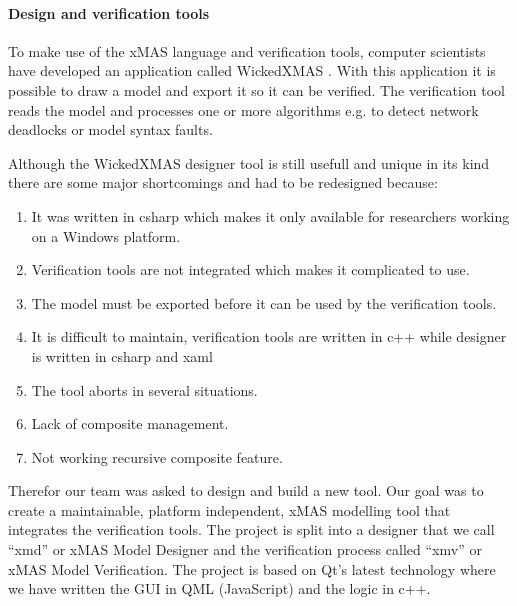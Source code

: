 \paragraph{Design and verification tools}

To make use of the xMAS language and verification tools, computer scientists
have developed an application called WickedXMAS \cite{WickedXmas}.
With this application it is possible to draw a model and export it so it can be
verified. The verification tool reads the model and processes one or more
algorithms e.g. to detect network deadlocks or model syntax faults.

Although the WickedXMAS designer tool is still usefull and unique in its kind
there are some major shortcomings and had to be redesigned because:
\begin{enumerate}
\item It was written in csharp which makes it only available for researchers
working on a Windows platform.
\item Verification tools are not integrated which
makes it complicated to use.
\item The model must be exported before it can be
used by the verification tools.
\item It is difficult to maintain, verification tools are written in c++ while
designer is written in csharp and xaml
\item The tool aborts in several situations.
\item Lack of composite management.
\item Not working recursive composite feature.
\end{enumerate}

Therefor our team was asked to design and build a new tool. Our goal was to
create a maintainable, platform independent, xMAS modelling tool that integrates
the verification tools. The project is split into a designer that we call
``xmd'' or xMAS Model Designer and the verification process called ``xmv'' or
xMAS Model Verification. The project is based on Qt's latest technology where we
have written the GUI in QML (JavaScript) and the logic in c++.

